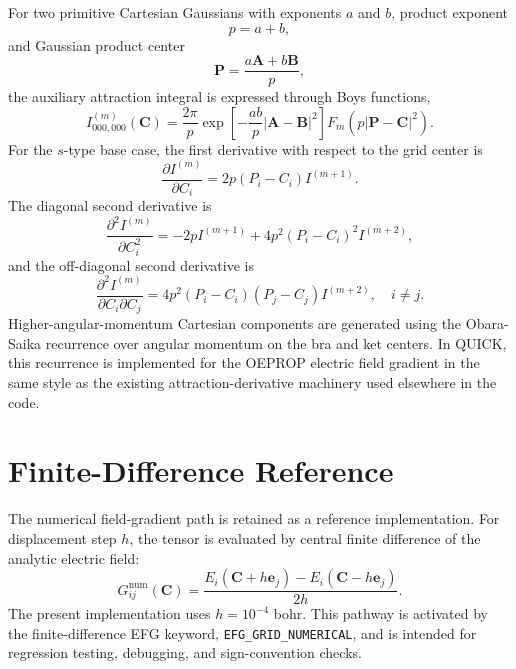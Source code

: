 \documentclass[journal=jcisd8,manuscript=article]{achemso}
\newcommand{\quickkeyword}[1]{\texttt{#1}}
\begin{document}
For two primitive Cartesian Gaussians with exponents \(a\) and \(b\), product exponent
\begin{equation}
  p = a+b,
\end{equation}
and Gaussian product center
\begin{equation}
  \mathbf{P} = \frac{a\mathbf{A}+b\mathbf{B}}{p},
\end{equation}
the auxiliary attraction integral is expressed through Boys functions,
\begin{equation}
  I^{(m)}_{000,000}(\mathbf{C})
  =
  \frac{2\pi}{p}
  \exp\left[-\frac{ab}{p}|\mathbf{A}-\mathbf{B}|^2\right]
  F_m\left(p|\mathbf{P}-\mathbf{C}|^2\right).
\end{equation}
For the \(s\)-type base case, the first derivative with respect to the grid center is
\begin{equation}
  \frac{\partial I^{(m)}}{\partial C_i}
  =
  2p(P_i-C_i)I^{(m+1)}.
  \label{eq:first_derivative}
\end{equation}
The diagonal second derivative is
\begin{equation}
  \frac{\partial^2 I^{(m)}}{\partial C_i^2}
  =
  -2pI^{(m+1)}
  +
  4p^2(P_i-C_i)^2I^{(m+2)},
  \label{eq:diag_second}
\end{equation}
and the off-diagonal second derivative is
\begin{equation}
  \frac{\partial^2 I^{(m)}}{\partial C_i\partial C_j}
  =
  4p^2(P_i-C_i)(P_j-C_j)I^{(m+2)},
  \quad i\ne j.
  \label{eq:offdiag_second}
\end{equation}
Higher-angular-momentum Cartesian components are generated using the Obara-Saika recurrence over angular momentum on the bra and ket centers.\cite{obara_saika,hgp,helgaker_book}  In QUICK, this recurrence is implemented for the OEPROP electric field gradient in the same style as the existing attraction-derivative machinery used elsewhere in the code.

\section{Finite-Difference Reference}

The numerical field-gradient path is retained as a reference implementation.  For displacement step \(h\), the tensor is evaluated by central finite difference of the analytic electric field:
\begin{equation}
  G_{ij}^{\mathrm{num}}(\mathbf{C})
  =
  \frac{
    E_i(\mathbf{C}+h\mathbf{e}_j)
    -
    E_i(\mathbf{C}-h\mathbf{e}_j)
  }{2h}.
  \label{eq:finite_difference}
\end{equation}
The present implementation uses \(h=10^{-4}\) bohr.  This pathway is activated by the finite-difference EFG keyword, \quickkeyword{EFG\_GRID\_\allowbreak NUMERICAL}, and is intended for regression testing, debugging, and sign-convention checks.
\end{document}
